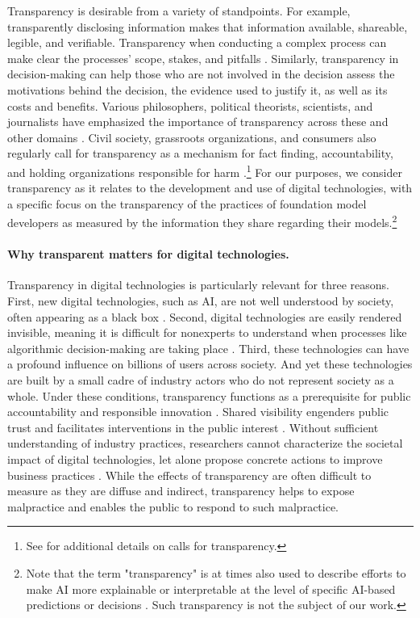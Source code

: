 Transparency is desirable from a variety of standpoints.
For example, transparently disclosing information makes that information available, shareable, legible, and verifiable. 
Transparency when conducting a complex process can make clear the processes' scope, stakes, and pitfalls \citep{lathrop2010open}. 
Similarly, transparency in decision-making can help those who are not involved in the decision assess the motivations behind the decision, the evidence used to justify it, as well as its costs and benefits.
Various philosophers, political theorists, scientists, and journalists have emphasized the importance of transparency across these and other domains \citep{johnston2006good,florini2007right, benkler2013practical, schudson2015rise}. 
Civil society, grassroots organizations, and consumers also regularly call for transparency as a mechanism for fact finding, accountability, and holding organizations responsible for harm \citep{heikkila2023high,diresta2022openblackbox}.\footnote{See  for additional details on calls for transparency.}
For our purposes, we consider transparency as it relates to the development and use of digital technologies, with a specific focus on the transparency of the practices of foundation model developers as measured by the information they share regarding their models.\footnote{Note that the term "transparency" is at times also used to describe efforts to make AI more explainable or interpretable at the level of specific AI-based predictions or decisions \citep{liao2023transparency, zou2023representation}. 
Such transparency is not the subject of our work.} 

\paragraph{Why transparent matters for digital technologies.}
Transparency in digital technologies is particularly relevant for three reasons.
First, new digital technologies, such as AI, are not well understood by society, often appearing as a black box \citep{castelvecchi2016openblackbox}. 
Second, digital technologies are easily rendered invisible, meaning it is difficult for nonexperts to understand when processes like algorithmic decision-making are taking place \citep{ng_conceptualizing_2021}.
Third, these technologies can have a profound influence on billions of users across society.
And yet these technologies are built by a small cadre of industry actors who do not represent society as a whole.
Under these conditions, transparency functions as a prerequisite for public accountability and responsible innovation \citep{klyman2023open}.
Shared visibility engenders public trust and facilitates interventions in the public interest \citep{hardin2002trust}. 
Without sufficient understanding of industry practices, researchers cannot characterize the societal impact of digital technologies, let alone propose concrete actions to improve business practices \citep{pasquale2015black}.
While the effects of transparency are often difficult to measure as they are diffuse and indirect, transparency helps to expose malpractice and enables the public to respond to such malpractice.


